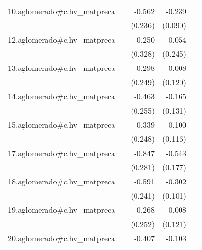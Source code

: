 {\begin{longtable}{l*{4}{D{.}{.}{-1}}}
\addlinespace
10.aglomerado#c.hv\_matpreca&                     &      -0.562\sym{*}  &      -0.239\sym{**} &                     \\
            &                     &     (0.236)         &     (0.090)         &                     \\
\addlinespace
12.aglomerado#c.hv\_matpreca&                     &      -0.250         &       0.054         &                     \\
            &                     &     (0.328)         &     (0.245)         &                     \\
\addlinespace
13.aglomerado#c.hv\_matpreca&                     &      -0.298         &       0.008         &                     \\
            &                     &     (0.249)         &     (0.120)         &                     \\
\addlinespace
14.aglomerado#c.hv\_matpreca&                     &      -0.463         &      -0.165         &                     \\
            &                     &     (0.255)         &     (0.131)         &                     \\
\addlinespace
15.aglomerado#c.hv\_matpreca&                     &      -0.339         &      -0.100         &                     \\
            &                     &     (0.248)         &     (0.116)         &                     \\
\addlinespace
17.aglomerado#c.hv\_matpreca&                     &      -0.847\sym{**} &      -0.543\sym{**} &                     \\
            &                     &     (0.281)         &     (0.177)         &                     \\
\addlinespace
18.aglomerado#c.hv\_matpreca&                     &      -0.591\sym{*}  &      -0.302\sym{**} &                     \\
            &                     &     (0.241)         &     (0.101)         &                     \\
\addlinespace
19.aglomerado#c.hv\_matpreca&                     &      -0.268         &       0.008         &                     \\
            &                     &     (0.252)         &     (0.121)         &                     \\
\addlinespace
20.aglomerado#c.hv\_matpreca&                     &      -0.407         &      -0.103         &                     \\

\end{longtable}}
